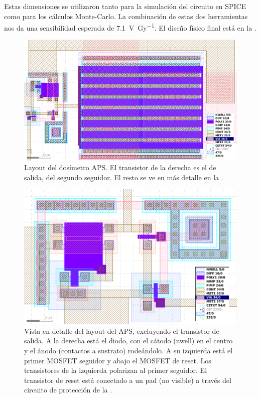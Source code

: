 Estas dimensiones se utilizaron tanto para la simulación del circuito en SPICE
como para los cálculos Monte-Carlo.
La combinación de estas dos herramientas nos da una sensibilidad esperada de 
\SI{7.1}{\volt\per\gray}.
El diseño físico final está en la .
\begin{figure}[p]
    \centering
    \includegraphics[width=\columnwidth]{figuras/gds/aps/todo.png}
    \caption{Layout del dosímetro APS. 
    El transistor de la derecha es el de salida, del segundo seguidor.
    El resto se ve en más detalle en la .}
    \label{fig:layoutaps}
\end{figure}
\begin{figure}[p]
    \centering
    \includegraphics[width=\columnwidth]{figuras/gds/aps/zoom.png}
    \caption{Vista en detalle del layout del APS, excluyendo el transistor de
        salida.
        A la derecha está el diodo, con el cátodo (nwell) en el centro y el
        ánodo (contactos a sustrato) rodeándolo.
        A su izquierda está el primer MOSFET seguidor y abajo el MOSFET de
        reset.
        Los transistores de la izquierda polarizan al primer seguidor.
    El transistor de reset está conectado a un pad (no visible) a través del
    circuito de protección de la .}
    \label{fig:layoutapszoom}
\end{figure}
